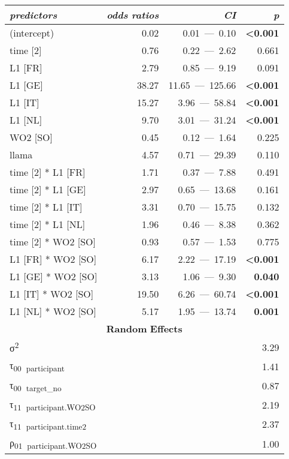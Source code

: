 \begin{table}
    \begin{tabularx}{\textwidth}{Xrrr}
    \lsptoprule
    \textit{predictors} & \textit{odds} \textit{ratios} & \textit{CI} & \textit{p}\\
    \midrule
    (intercept) & 0.02 & 0.01~—~0.10 & \textbf{<0.001}\\
    time [2] & 0.76 & 0.22~—~2.62 & 0.661\\
    L1 [FR] & 2.79 & 0.85~—~9.19 & 0.091\\
    L1 [GE] & 38.27 & 11.65~—~125.66 & \textbf{<0.001}\\
    L1 [IT] & 15.27 & 3.96~—~58.84 & \textbf{<0.001}\\
    L1 [NL] & 9.70 & 3.01~—~31.24 & \textbf{<0.001}\\
    WO2 [SO] & 0.45 & 0.12~—~1.64 & 0.225\\
    llama & 4.57 & 0.71~—~29.39 & 0.110\\
    time [2] * L1 [FR] & 1.71 & 0.37~—~7.88 & 0.491\\
    time [2] * L1 [GE] & 2.97 & 0.65~—~13.68 & 0.161\\
    time [2] * L1 [IT] & 3.31 & 0.70~—~15.75 & 0.132\\
    time [2] * L1 [NL] & 1.96 & 0.46~—~8.38 & 0.362\\
    time [2] * WO2 [SO] & 0.93 & 0.57~—~1.53 & 0.775\\
    L1 [FR] * WO2 [SO] & 6.17 & 2.22~—~17.19 & \textbf{<0.001}\\
    L1 [GE] * WO2 [SO] & 3.13 & 1.06~—~9.30 & \textbf{0.040}\\
    L1 [IT] * WO2 [SO] & 19.50 & 6.26~—~60.74 & \textbf{<0.001}\\
    L1 [NL] * WO2 [SO] & 5.17 & 1.95~—~13.74 & \textbf{0.001}\\
    \multicolumn{4}{c}{\textbf{Random} \textbf{Effects}}\\
    σ\textsuperscript{2} & \multicolumn{3}{r}{3.29}\\
    τ\textsubscript{00}~\textsubscript{participant} & \multicolumn{3}{r}{1.41}\\
    τ\textsubscript{00}~\textsubscript{target\_no} & \multicolumn{3}{r}{0.87}\\
    τ\textsubscript{11}~\textsubscript{participant.WO2SO} & \multicolumn{3}{r}{2.19}\\
    τ\textsubscript{11}~\textsubscript{participant.time2} & \multicolumn{3}{r}{2.37}\\
    ρ\textsubscript{01}~\textsubscript{participant.WO2SO} & \multicolumn{3}{r}{1.00}\\

\end{tabularx}
\end{table}
